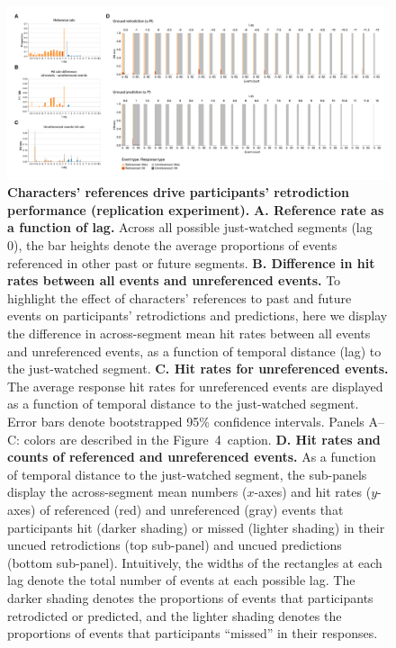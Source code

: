 \documentclass[10pt]{article}
\newcommand{\resultTwo}{4}
\begin{document}
\begin{figure}[tp]
    \centering
    \includegraphics[width=\textwidth]{results3_rep}

      \caption{\textbf{Characters' references drive participants' retrodiction performance (replication experiment).} \textbf{A. Reference rate as a function of lag.} Across all possible just-watched segments (lag 0), the bar heights denote the average proportions of events referenced in other past or future segments. \textbf{B. Difference in hit rates between all events and unreferenced events.} To highlight the effect of characters' references to past and future events on participants' retrodictions and predictions, here we display the difference in across-segment mean hit rates between all events and unreferenced events, as a function of temporal distance (lag) to the just-watched segment. \textbf{C. Hit rates for unreferenced events.} The average response hit rates for unreferenced events are displayed as a function of temporal distance to the just-watched segment. Error bars denote bootstrapped 95\% confidence intervals. Panels A--C: colors are described in the Figure~\resultTwo~caption. \textbf{D. Hit rates and counts of referenced and unreferenced events.} As a function of temporal distance to the just-watched segment, the sub-panels display the across-segment mean numbers ($x$-axes) and hit rates ($y$-axes) of referenced (red) and unreferenced (gray) events that participants hit (darker shading) or missed (lighter shading) in their uncued retrodictions (top sub-panel) and uncued predictions (bottom sub-panel). Intuitively, the widths of the rectangles at each lag denote the total number of events at each possible lag. The darker shading denotes the proportions of events that participants retrodicted or predicted, and the lighter shading denotes the proportions of events that participants ``missed'' in their responses.}
      
    \label{fig:result3_rep}
\end{figure}
\end{document}

